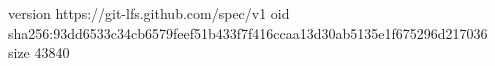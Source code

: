 version https://git-lfs.github.com/spec/v1
oid sha256:93dd6533c34cb6579feef51b433f7f416ccaa13d30ab5135e1f675296d217036
size 43840

